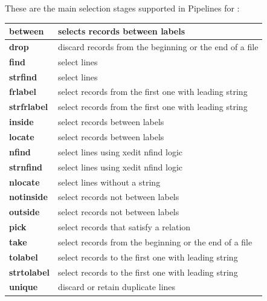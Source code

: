 These are the main selection stages supported in Pipelines for \nr{}:

\begin{tabularx}{\textwidth}{>{\bfseries}lX}
\toprule
between&selects records between labels
\\\midrule
drop&discard records from the beginning or the end of a file
\\\midrule
find&select lines
\\\midrule
strfind&select lines
\\\midrule
frlabel&select records from the first one with leading string
\\\midrule
strfrlabel&select records from the first one with leading string
\\\midrule
inside&select records between labels
\\\midrule
locate&select records between labels
\\\midrule
nfind&select lines using xedit nfind logic
\\\midrule
strnfind&select lines using xedit nfind logic
\\\midrule
nlocate&select lines without a string
\\\midrule
notinside&select records not between labels
\\\midrule
outside&select records not between labels
\\\midrule
pick&select records that satisfy a relation
\\\midrule
take&select records from the beginning or the end of a file
\\\midrule
tolabel&select records to the first one with leading string
\\\midrule
strtolabel&select records to the first one with leading string
\\\midrule
unique&discard or retain duplicate lines
\\\bottomrule
\end{tabularx}

